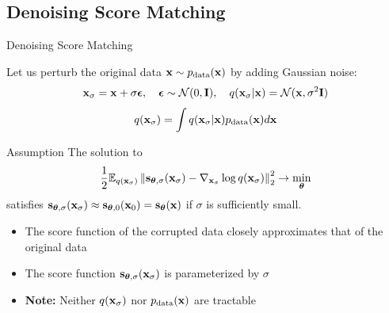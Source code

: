\documentclass{beamer}
\begin{document}
\subsection{Denoising Score Matching}
\begin{frame}{Denoising Score Matching}

	Let us perturb the original data $\mathbf{x} \sim p_{\text{data}}(\mathbf{x})$ by adding Gaussian noise:
	\vspace{-0.3cm}
	\[
		\mathbf{x}_{\sigma} = \mathbf{x} + \sigma \boldsymbol{\epsilon}, \quad \boldsymbol{\epsilon} \sim \mathcal{N}(0, \mathbf{I}), \quad q(\mathbf{x}_{\sigma} | \mathbf{x}) = \mathcal{N}(\mathbf{x}, \sigma^2 \mathbf{I})
	\]
	\vspace{-0.5cm}
	\[
		q(\mathbf{x}_{\sigma}) = \int q(\mathbf{x}_{\sigma} | \mathbf{x}) p_{\text{data}}(\mathbf{x}) d\mathbf{x}
	\]
    \eqpause
	\vspace{-0.5cm} 
	\begin{block}{Assumption}
		The solution to
		\[
			\frac{1}{2} \mathbb{E}_{q(\mathbf{x}_{\sigma})}\left\| \mathbf{s}_{\boldsymbol{\theta}, \sigma}(\mathbf{x}_{\sigma}) - \nabla_{\mathbf{x}_{\sigma}} \log q(\mathbf{x}_{\sigma}) \right\|_2^2 \rightarrow \min_{\boldsymbol{\theta}}
		\]
		\vspace{-0.3cm}
		satisfies $\mathbf{s}_{\boldsymbol{\theta}, \sigma}(\mathbf{x}_{\sigma}) \approx \mathbf{s}_{\boldsymbol{\theta}, 0}(\mathbf{x}_0) = \mathbf{s}_{\boldsymbol{\theta}}(\mathbf{x})$ if $\sigma$ is sufficiently small.
	\end{block}
    \eqpause
	\begin{itemize}
		\item The score function of the corrupted data closely approximates that of the original data
		\item The score function $\mathbf{s}_{\boldsymbol{\theta}, \sigma}(\mathbf{x}_{\sigma})$ is parameterized by $\sigma$
		\item \textbf{Note:} Neither $q(\mathbf{x}_{\sigma})$ nor $p_{\text{data}}(\mathbf{x})$ are tractable
	\end{itemize}
\end{frame}
\end{document}
